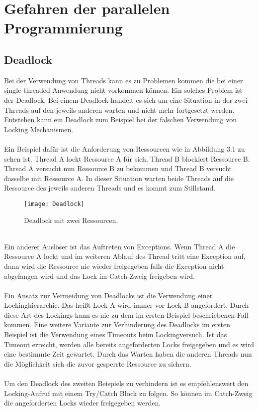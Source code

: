 \section{Gefahren der parallelen Programmierung}
\subsection{Deadlock}
Bei der Verwendung von Threads kann es zu Problemen kommen die bei einer single-threaded Anwendung nicht vorkommen können. Ein solches Problem ist der Deadlock. Bei einem Deadlock handelt es sich um eine Situation in der zwei Threads auf den jeweils anderen warten und nicht mehr fortgesetzt werden. Entstehen kann ein Deadlock zum Beispiel bei der falschen Verwendung von Locking Mechanismen.\cite{34}
\\
\\
Ein Beispiel dafür ist die Anforderung von Ressourcen wie in Abbildung 3.1 zu sehen ist. Thread A lockt Ressource A für sich, Thread B blockiert Ressource B. Thread A versucht nun Ressource B zu bekommen und Thread B versucht dasselbe mit Ressource A. In dieser Situation warten beide Threads auf die Ressource des jeweils anderen Threads und es kommt zum Stillstand.
\\
\begin{figure}
\centering
\texttt{[image: Deadlock]}
\caption{Deadlock mit zwei Ressourcen.}
\label{fig:Deadlock}
\end{figure}
\\
Ein anderer Auslöser ist das Auftreten von Exceptions. Wenn Thread A die Ressource A lockt und im weiteren Ablauf des Thread tritt eine Exception auf, dann wird die Ressource nie wieder freigegeben falls die Exception nicht abgefangen wird und das Lock im Catch-Zweig freigeben wird.
\\
\\
Ein Ansatz zur Vermeidung von Deadlocks ist die Verwendung einer Lockinghierarchie. Das heißt Lock A wird immer vor Lock B angefordert. Durch diese Art des Lockings kann es nie zu dem im ersten Beispiel beschriebenen Fall kommen. Eine weitere Variante zur Verhinderung des Deadlocks im ersten Beispiel ist die Verwendung eines Timeouts beim Lockingversuch. Ist das Timeout erreicht, werden alle bereits angeforderten Locks freigegeben und es wird eine bestimmte Zeit gewartet. Durch das Warten haben die anderen Threads nun die Möglichkeit sich die zuvor gesperrte Ressource zu sichern.
\\
\\
Um den Deadlock des zweiten Beispiels zu verhindern ist es empfehlenswert den Locking-Aufruf mit einem Try/Catch Block zu folgen. So können im Catch-Zweig die angeforderten Locks wieder freigegeben werden.

